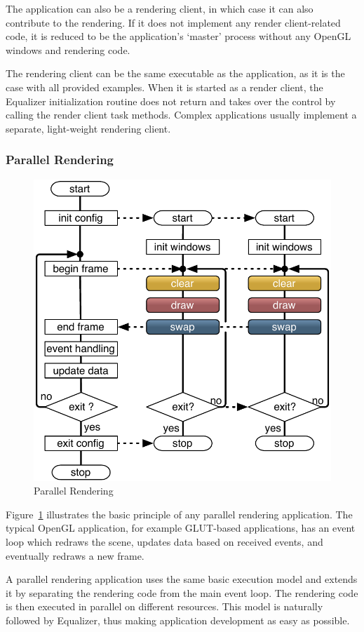 \documentclass[10pt,a4]{scrartcl}
\newcommand{\fig}[1]{Figure~\ref{#1}}
\begin{document}
The application can also be a rendering client, in which case it can
also contribute to the rendering. If it does not implement any render
client-related code, it is reduced to be the application's `master'
process without any OpenGL windows and rendering code.

The rendering client can be the same executable as the application, as
it is the case with all provided examples. When it is started as a
render client, the Equalizer initialization routine does not return and
takes over the control by calling the render client task
methods. Complex applications usually implement a separate, light-weight
rendering client.

\subsubsection{Parallel Rendering}

\begin{figure}
  \vspace{-1em}
  \includegraphics[width=.618\textwidth]{images/executionFlow.pdf}
  {\caption{\small\label{fExecutionFlow}Parallel Rendering}}
  \vspace{-1em}
\end{figure}

\fig{fExecutionFlow} illustrates the basic principle of any parallel
rendering application. The typical OpenGL application, for example
GLUT-based applications, has an event loop which redraws the scene,
updates data based on received events, and eventually redraws a new
frame.

A parallel rendering application uses the same basic execution model and
extends it by separating the rendering code from the main event
loop. The rendering code is then executed in parallel on different
resources. This model is naturally followed by Equalizer, thus making
application development as easy as possible.
\end{document}
